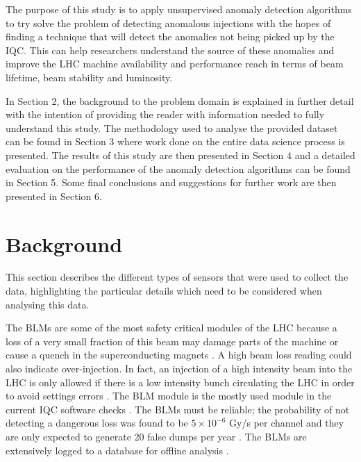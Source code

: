 \documentclass[conference, a4paper]{IEEEtran}
\begin{document}
	\par The purpose of this study is to apply unsupervised anomaly detection algorithms to try solve the problem of detecting anomalous injections with the hopes of finding a technique that will detect the anomalies not being picked up by the IQC. This can help researchers understand the source of these anomalies and improve the LHC machine availability and performance reach in terms of beam lifetime, beam stability and luminosity.
	
	\par In Section 2, the background to the problem domain is explained in further detail with the intention of providing the reader with information needed to fully understand this study. The methodology used to analyse the provided dataset can be found in Section 3 where work done on the entire data science process is presented. The results of this study are then presented in Section 4 and a detailed evaluation on the performance of the anomaly detection algorithms can be found in Section 5. Some final conclusions and suggestions for further work are then presented in Section 6.
	
	\section{Background}

	\par This section describes the different types of sensors that were used to collect the data, highlighting the particular details which need to be considered when analysing this data.
	
	\par The BLMs are some of the most safety critical modules of the LHC because a loss of a very small fraction of this beam may damage parts of the machine or cause a quench in the superconducting magnets \cite{Holzer2006}. A high beam loss reading could also indicate over-injection. In fact, an injection of a high intensity beam into the LHC is only allowed if there is a low intensity bunch circulating the LHC in order to avoid settings errors \cite{Kain2010}. The BLM module is the mostly used module in the current IQC software checks \cite{Drosdal2011}. The BLMs must be reliable; the probability of not detecting a dangerous loss was found to be $5\times10^{-6}$ Gy/s per channel and they are only expected to generate 20 false dumps per year \cite{Holzer2006}. The BLMs are extensively logged to a database for offline analysis \cite{Holzer2006}. 
	
\end{document}
